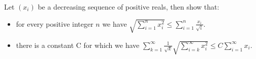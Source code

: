 Let \((x_i)\) be a decreasing sequence of positive reals, then show that:
\begin{itemize}

\item[(a)] for every positive integer \(n\) we have \(\sqrt{\sum^n_{i=1}{x_i^2}} \leq \sum^n_{i=1}\frac{x_i}{\sqrt{i}}\).

\item[(b)] there is a constant C for which we have \(\sum^{\infty}_{k=1}\frac{1}{\sqrt{k}}\sqrt{\sum^{\infty}_{i=k}x_i^2} \le C\sum^{\infty}_{i=1}x_i\).
\end{itemize}
